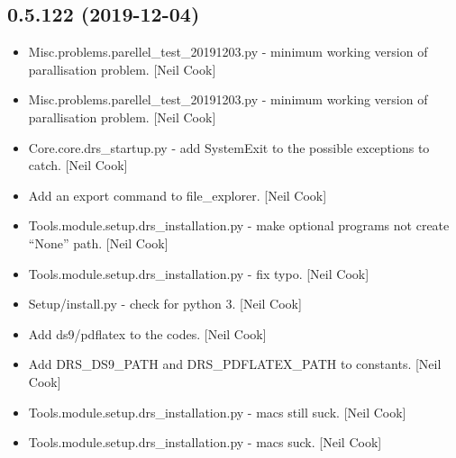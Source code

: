 \documentclass[a4paper,10pt,english]{report}
\begin{document}
\subsection{0.5.122 (2019-12-04)}
\label{\detokenize{misc/changelog:id19}}\begin{itemize}
\item {} 
Misc.problems.parellel\_test\_20191203.py - minimum working version of
parallisation problem. {[}Neil Cook{]}

\item {} 
Misc.problems.parellel\_test\_20191203.py - minimum working version of
parallisation problem. {[}Neil Cook{]}

\item {} 
Core.core.drs\_startup.py - add SystemExit to the possible exceptions
to catch. {[}Neil Cook{]}

\item {} 
Add an export command to file\_explorer. {[}Neil Cook{]}

\item {} 
Tools.module.setup.drs\_installation.py - make optional programs not
create “None” path. {[}Neil Cook{]}

\item {} 
Tools.module.setup.drs\_installation.py - fix typo. {[}Neil Cook{]}

\item {} 
Setup/install.py - check for python 3. {[}Neil Cook{]}

\item {} 
Add ds9/pdflatex to the codes. {[}Neil Cook{]}

\item {} 
Add DRS\_DS9\_PATH and DRS\_PDFLATEX\_PATH to constants. {[}Neil Cook{]}

\item {} 
Tools.module.setup.drs\_installation.py - macs still suck. {[}Neil Cook{]}

\item {} 
Tools.module.setup.drs\_installation.py - macs suck. {[}Neil Cook{]}

\end{itemize}
\end{document}
